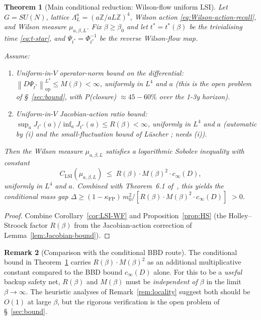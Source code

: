 \documentclass[11pt,a4paper]{amsart}
\newtheorem{theorem}{Theorem}[section]
\theoremstyle{definition}
\newtheorem{remark}[theorem]{Remark}
\newcommand{\Z}{\mathbb{Z}}
\newcommand{\norm}[1]{\left\lVert#1\right\rVert}
\newcommand{\kFP}{\kappa_{\mathrm{FP}}}
\begin{document}
\begin{theorem}[Main conditional reduction: Wilson-flow uniform LSI]
\label{thm:main}
Let $G = SU(N)$, lattice $\Lambda_L^a = (a\Z/aL\Z)^4$, Wilson action
\eqref{eq:Wilson-action-recall}, and Wilson measure $\mu_{a,\beta,L}$.
Fix $\beta\geq\beta_0$ and let $t^* = t^*(\beta)$ be the trivialising
time \eqref{eq:t-star}, and $\Psi_{t^*} = \Phi_{t^*}^{-1}$ be the
reverse Wilson-flow map.

Assume:
\begin{enumerate}[label=(\roman*),leftmargin=2em]
\item Uniform-in-$V$ operator-norm bound on the differential:
$\norm{D\Psi_{t^*}}_\mathrm{op}^{L^4} \leq M(\beta) < \infty$, uniformly
in $L^4$ and $a$ (this is the open problem of \S~\ref{sec:bound}, with
P(closure) $\approx 45-60\%$ over the 1-3y horizon).
\item Uniform-in-$V$ Jacobian-action ratio bound:
$\sup_a J_{t^*}(a)/\inf_a J_{t^*}(a) \leq R(\beta) < \infty$,
uniformly in $L^4$ and $a$
(automatic by (i) and the small-fluctuation bound of L\"uscher
\cite{Luscher2009TrivializingMaps}; needs (i)).
\end{enumerate}
Then the Wilson measure $\mu_{a,\beta,L}$ satisfies a logarithmic
Sobolev inequality with constant
$$
C_\mathrm{LSI}(\mu_{a,\beta,L}) \;\leq\; R(\beta)\cdot M(\beta)^2\cdot c_\infty(D),
$$
\emph{uniformly} in $L^4$ and $a$. Combined with Theorem~6.1
of~\cite{RemondiereKRFPB_2026}, this yields the conditional mass gap
$\Delta \geq (1-\kFP)\,m_0^2 / [R(\beta)\cdot M(\beta)^2\cdot c_\infty(D)]$
$> 0$.
\end{theorem}

\begin{proof}
Combine Corollary~\ref{cor:LSI-WF} and Proposition~\ref{prop:HS} (the
Holley--Stroock factor $R(\beta)$ from the Jacobian-action correction
of Lemma~\ref{lem:Jacobian-bound}).
\end{proof}

\begin{remark}[Comparison with the conditional BBD route]
The conditional bound in Theorem~\ref{thm:main} carries
$R(\beta)\cdot M(\beta)^2$ as an additional multiplicative constant
compared to the BBD bound $c_\infty(D)$ alone. For this to be a
\emph{useful} backup safety net, $R(\beta)$ and $M(\beta)$ must be
\emph{independent of $\beta$} in the limit $\beta\to\infty$. The
heuristic analyses of Remark~\ref{rem:locality} suggest both should be
$O(1)$ at large $\beta$, but the rigorous verification is the open
problem of \S~\ref{sec:bound}.
\end{remark}
\end{document}
